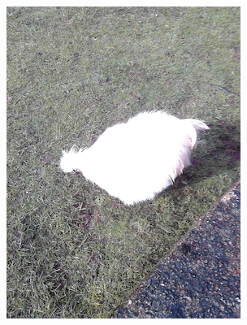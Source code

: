 \documentclass{l4proj}
\begin{document}
\begin{figure}[ht]
\begin{subfigure}[h!]{0.18\textwidth}
    \includegraphics[width=\textwidth, trim={0cm 1.6cm 0cm 1.6cm}, clip]{images/dataset/evil_chicken/rgb.png}

\end{subfigure}
\end{figure}
\end{document}
